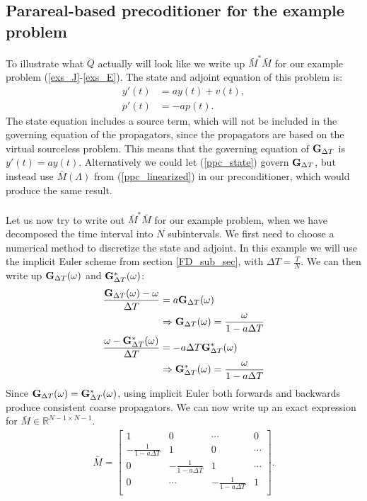 \subsection{Parareal-based precoditioner for the example problem}
To illustrate what $Q$ actually will look like we write up $\bar M^*\bar M$ for our example problem (\ref{exs_J}-\ref{exs_E}). The state and adjoint equation of this problem is:
\begin{align}
y'(t) &= ay(t) + v(t), \label{ppc_state} \\
p'(t) &= -ap(t). \label{ppc_adjoint}
\end{align}
The state equation includes a source term, which will not be included in the governing equation of the propagators, since the propagators are based on the virtual sourceless problem. This means that the governing equation of $\bold G_{\Delta T}$ is $y'(t) = ay(t)$. Alternatively we could let (\ref{ppc_state}) govern $\bold G_{\Delta T}$, but instead use $\bar M(\Lambda)$ from (\ref{ppc_linearized}) in our preconditioner, which would produce the same result. 
\\
\\
Let us now try to write out $\bar M^*\bar M$ for our example problem, when we have decomposed the time interval into $N$ subintervals. We first need to choose a numerical method to discretize the state and adjoint. In this example we will use the implicit Euler scheme from section \ref{FD_sub_sec}, with $\Delta T=\frac{T}{N}$. We can then write up $\bold G_{\Delta T}(\omega)$ and $\bold G_{\Delta T}^*(\omega)$:
\begin{align*}
\frac{\bold G_{\Delta T}(\omega)-\omega}{\Delta T}&=  a\bold G_{\Delta T}(\omega) \\
&\Rightarrow \bold G_{\Delta T}(\omega)= \frac{\omega}{1-a\Delta T} \\
\frac{\omega-\bold G_{\Delta T}^*(\omega)}{\Delta T}&= -a\Delta T \bold G_{\Delta T}^*(\omega) \\
&\Rightarrow \bold G_{\Delta T}^*(\omega)= \frac{\omega}{1-a\Delta T} 
\end{align*}
Since $\bold G_{\Delta T}(\omega)= \bold G_{\Delta T}^*(\omega)$, using implicit Euler both forwards and backwards produce consistent coarse propagators. We can now write up an exact expression for $\bar M\in\mathbb{R}^{N-1\times N-1}$. 
\begin{align*}
\bar M = \left[ \begin{array}{cccc}
   	1 & 0 & \cdots & 0 \\  
   	-\frac{1}{1-a\Delta T} & 1 & 0 & \cdots \\ 
   	0 &-\frac{1}{1-a\Delta T} & 1  & \cdots \\
   	0 &\cdots &-\frac{1}{1-a\Delta T} & 1  \\
  	\end{array}  \right].
\end{align*}
